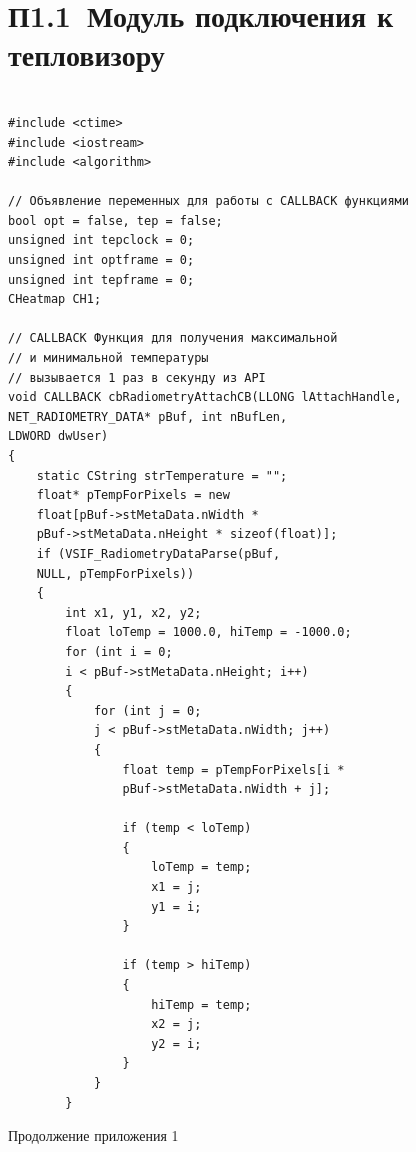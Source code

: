 \documentclass[14pt, a4paper]{extreport}
\begin{document}
\section*{П1.1~Модуль подключения к тепловизору}
\begin{Verbatim}[fontseries=c, fontsize=\fontsize{10pt}{12pt}\selectfont]

#include <ctime>
#include <iostream>
#include <algorithm>

// Объявление переменных для работы с CALLBACK функциями
bool opt = false, tep = false;
unsigned int tepclock = 0;
unsigned int optframe = 0;
unsigned int tepframe = 0;
CHeatmap CH1;

// CALLBACK Функция для получения максимальной 
// и минимальной температуры
// вызывается 1 раз в секунду из API
void CALLBACK cbRadiometryAttachCB(LLONG lAttachHandle, 
NET_RADIOMETRY_DATA* pBuf, int nBufLen, 
LDWORD dwUser)
{
	static CString strTemperature = "";
	float* pTempForPixels = new 
	float[pBuf->stMetaData.nWidth * 
	pBuf->stMetaData.nHeight * sizeof(float)];
	if (VSIF_RadiometryDataParse(pBuf, 
	NULL, pTempForPixels))
	{
		int x1, y1, x2, y2;
		float loTemp = 1000.0, hiTemp = -1000.0;
		for (int i = 0; 
		i < pBuf->stMetaData.nHeight; i++)
		{
			for (int j = 0; 
			j < pBuf->stMetaData.nWidth; j++)
			{
				float temp = pTempForPixels[i * 
				pBuf->stMetaData.nWidth + j];
				
				if (temp < loTemp)
				{
					loTemp = temp;
					x1 = j;
					y1 = i;
				}
				
				if (temp > hiTemp)
				{
					hiTemp = temp;
					x2 = j;
					y2 = i;
				}
			}
		}
\end{Verbatim}
\begin{flushright} \noindent Продолжение приложения 1 \end{flushright}
\end{document}
